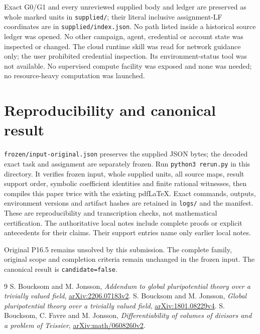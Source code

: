 \documentclass[10pt]{article}
\begin{document}
Exact G0/G1 and every unreviewed supplied body and ledger are preserved
as whole marked units in \texttt{supplied/}; their literal inclusive
assignment-LF coordinates are in \texttt{supplied/index.json}.
No path listed inside a historical source ledger was opened. No other
campaign, agent, credential or account state was inspected or changed.
The cloud runtime skill was read for network guidance only; the user
prohibited credential inspection. Its environment-status tool was not
available. No supervised compute facility was exposed and none was
needed; no resource-heavy computation was launched.

\section{Reproducibility and canonical result}
\texttt{frozen/input-original.json} preserves the supplied JSON bytes;
the decoded exact task and assignment are separately frozen. Run
\texttt{python3 rerun.py} in this directory. It verifies frozen input,
whole supplied units, all source maps, result support order, symbolic
coefficient identities and finite rational witnesses, then compiles
this paper twice with the existing pdfLaTeX. Exact commands, outputs,
environment versions and artifact hashes are retained in \texttt{logs/}
and the manifest. These are reproducibility and transcription checks,
not mathematical certification. The authoritative local notes include
complete proofs or explicit antecedents for their claims. Their support
entries name only earlier local notes.

Original P16.5 remains unsolved by this submission. The complete family,
original scope and completion criteria remain unchanged in the frozen
input. The canonical result is \texttt{candidate=false}.
\begin{thebibliography}{9}
 S. Boucksom and M. Jonsson,
\emph{Addendum to global pluripotential theory over a trivially valued field},
\href{https://arxiv.org/pdf/2206.07183v2}{arXiv:2206.07183v2}.
 S. Boucksom and M. Jonsson,
\emph{Global pluripotential theory over a trivially valued field},
\href{https://arxiv.org/pdf/1801.08229v4}{arXiv:1801.08229v4}.
 S. Boucksom, C. Favre and M. Jonsson,
\emph{Differentiability of volumes of divisors and a problem of Teissier},
\href{https://arxiv.org/html/math/0608260v2}{arXiv:math/0608260v2}.
\end{thebibliography}
\end{document}
